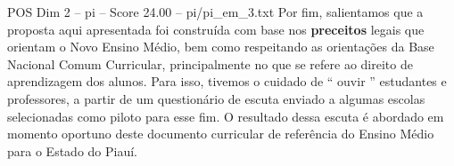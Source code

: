 \begin{textsample}{POS Dim 2 – pi – Score 24.00 – pi/pi\_em\_3.txt}
Por fim, salientamos que a proposta aqui apresentada foi construída com base nos \textbf{preceitos} legais que orientam o Novo Ensino Médio, bem como respeitando as orientações da Base Nacional Comum Curricular, principalmente no que se refere ao direito de aprendizagem dos alunos.
Para isso, tivemos o cuidado de “ ouvir ” estudantes e professores, a partir de um questionário de escuta enviado a algumas escolas selecionadas como piloto para esse fim.
O resultado dessa escuta é abordado em momento oportuno deste documento curricular de referência do Ensino Médio para o Estado do Piauí.

\end{textsample}
